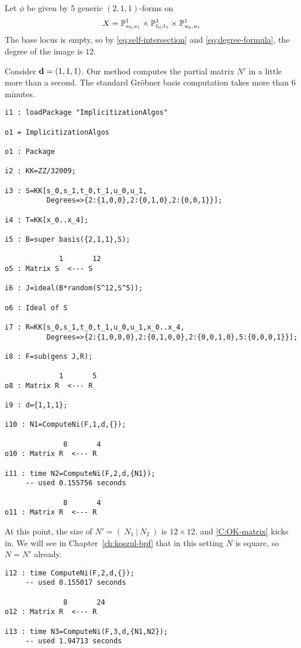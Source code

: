 \documentclass[fleqn,reqno]{amsart}
\begin{document}
\begin{example}[$\mt{ex601}$]
\label{ex601}
Let $\phi$ be given by 5 generic $(2,1,1)$-forms on
\[
	X=\mathbb{P}^1_{s_0,s_1}\times\mathbb{P}^1_{t_0,t_1}\times\mathbb{P}^1_{u_0,u_1}
\]
The base locus is empty,
so by \eqref{eq:self-intersection} and \eqref{eq:degree-formula},
the degree of the image is $12$.

Consider $\mathbf d=(1,1,1)$.
Our method computes the partial matrix $N'$ in a little more than a second.
The standard Gr\"obner basis computation takes more than 6 minutes.
\begin{verbatim}
i1 : loadPackage "ImplicitizationAlgos"

o1 = ImplicitizationAlgos

o1 : Package

i2 : KK=ZZ/32009;

i3 : S=KK[s_0,s_1,t_0,t_1,u_0,u_1,
          Degrees=>{2:{1,0,0},2:{0,1,0},2:{0,0,1}}];

i4 : T=KK[x_0..x_4];

i5 : B=super basis({2,1,1},S);

             1       12
o5 : Matrix S  <--- S

i6 : J=ideal(B*random(S^12,S^5));

o6 : Ideal of S

i7 : R=KK[s_0,s_1,t_0,t_1,u_0,u_1,x_0..x_4,
          Degrees=>{2:{1,0,0,0},2:{0,1,0,0},2:{0,0,1,0},5:{0,0,0,1}}];

i8 : F=sub(gens J,R);

             1       5
o8 : Matrix R  <--- R

i9 : d={1,1,1};

i10 : N1=ComputeNi(F,1,d,{});

              8       4
o10 : Matrix R  <--- R

i11 : time N2=ComputeNi(F,2,d,{N1});
     -- used 0.155756 seconds

              8       4
o11 : Matrix R  <--- R
\end{verbatim}
At this point, the size of $N'=(~N_1~|~N_2~)$ is $12\times12$,
and \eqref{C:OK-matrix} kicks in.
We will see in Chapter~\ref{ch:koszul-bpf} that in this setting $N$ is square,
so $N=N'$ already.

\begin{verbatim}
i12 : time ComputeNi(F,2,d,{});
     -- used 0.155017 seconds

              8       24
o12 : Matrix R  <--- R

i13 : time N3=ComputeNi(F,3,d,{N1,N2});
     -- used 1.94713 seconds


\end{verbatim}
\end{example}
\end{document}
